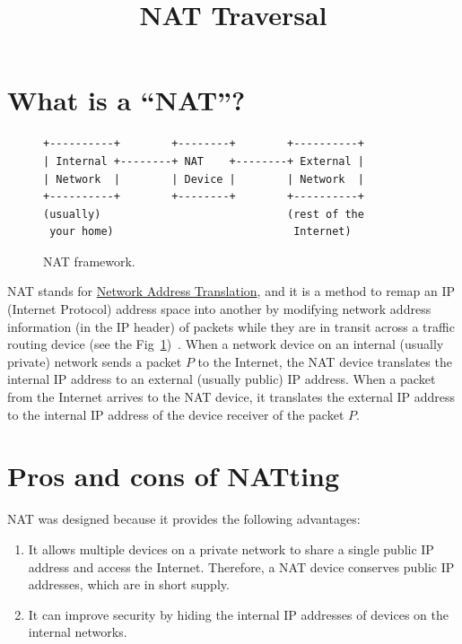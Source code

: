 
\title{NAT Traversal}

\maketitle
\tableofcontents

\section{What is a ``NAT''?}

\begin{figure}
\begin{verbatim}
+----------+        +--------+        +----------+
| Internal +--------+ NAT    +--------+ External |
| Network  |        | Device |        | Network  |
+----------+        +--------+        +----------+
(usually)                             (rest of the
 your home)                            Internet)
\end{verbatim}
\caption{NAT framework.}
\label{fig:NAT_framework}
\end{figure}

NAT stands for
\href{https://en.wikipedia.org/wiki/Network_address_translation}{Network
  Address Translation}, and it is a method to remap an IP
(Internet Protocol) address space into another by modifying network
address information (in the IP header) of packets while they are in
transit across a traffic routing device (see the
Fig~\ref{fig:NAT_framework})~\cite{srisuresh1999nat,Srisuresh2001}. When
a network device on an internal (usually private) network sends a
packet $P$ to the Internet, the NAT device translates the internal IP
address to an external (usually public) IP address. When a packet from
the Internet arrives to the NAT device, it translates the external IP
address to the internal IP address of the device receiver of the
packet $P$.

\section{Pros and cons of NATting}

NAT was designed because it provides the following advantages:
\begin{enumerate}
\item It allows multiple devices on a private network to share a
  single public IP address and access the Internet. Therefore, a NAT
  device conserves public IP addresses, which are in short supply.
\item It can improve security by hiding the internal IP addresses of
  devices on the internal networks.
\end{enumerate}

